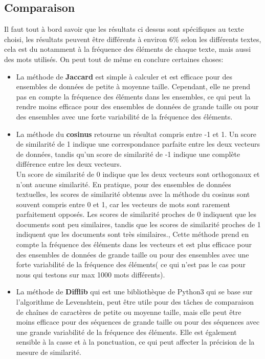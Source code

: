 \documentclass[french,12pt]{article}
\begin{document}
\subsection{Comparaison}
Il faut tout à bord savoir que les résultats ci dessus sont spécifiques au texte choisi, les résultats peuvent être différents à  environ  6\% selon les différents textes, cela est du notamment à  la fréquence des éléments de chaque texte, mais aussi des mots utilisés.
On peut tout de même en conclure certaines choses:
\begin{itemize}
    \item La méthode de \textbf{Jaccard} est simple à calculer et est  efficace pour des ensembles de données de petite à moyenne taille.
    Cependant, elle ne prend pas en compte la fréquence des éléments dans les ensembles, ce qui peut la rendre moins efficace pour des ensembles de données de grande taille ou pour des ensembles avec une forte variabilité de la fréquence des éléments.
    \item La méthode du \textbf{cosinus} retourne un résultat compris entre -1 et 1. Un score de similarité de 1 indique une correspondance parfaite entre les deux vecteurs de données, tandis qu'un score de similarité de -1 indique une complète différence entre les deux vecteurs. \\
    Un score de similarité de 0 indique que les deux vecteurs sont orthogonaux et n'ont aucune similarité.
    En pratique, pour des ensembles de données textuelles, les scores de similarité obtenus avec la méthode du cosinus sont souvent compris entre 0 et 1, car les vecteurs de mots sont rarement parfaitement opposés. Les scores de similarité proches de 0 indiquent que les documents sont peu similaires, tandis que les scores de similarité proches de 1 indiquent que les documents sont très similaires., 
     Cette méthode prend en compte la fréquence des éléments dans les vecteurs et est plus efficace pour des ensembles de données de grande taille ou pour des ensembles avec une forte variabilité de la fréquence des éléments( ce qui n'est pas le cas pour nous qui testons sur max 1000 mots différents).
    \item La méthode de \textbf{Difflib} qui est une bibliothèque de Python3 qui se base sur l'algorithme de Levenshtein, peut être utile pour des tâches de comparaison de chaînes de caractères de petite ou moyenne taille, mais elle peut être moins efficace pour des séquences de grande taille ou pour des séquences avec une grande variabilité de la fréquence des éléments. Elle est également sensible à la casse et à la ponctuation, ce qui peut affecter la précision de la mesure de similarité.
    
\end{itemize}
\end{document}
